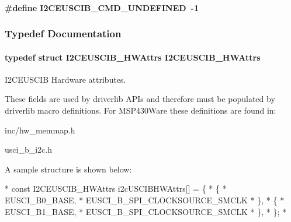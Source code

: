 \paragraph[{I2\-C\-E\-U\-S\-C\-I\-B\-\_\-\-C\-M\-D\-\_\-\-U\-N\-D\-E\-F\-I\-N\-E\-D}]{\setlength{\rightskip}{0pt plus 5cm}\#define I2\-C\-E\-U\-S\-C\-I\-B\-\_\-\-C\-M\-D\-\_\-\-U\-N\-D\-E\-F\-I\-N\-E\-D~-\/1}\label{_i2_c_e_u_s_c_i_b_8h_a8c78b9f1f07217026467a46de151f1ba}


\subsubsection{Typedef Documentation}
\paragraph[{I2\-C\-E\-U\-S\-C\-I\-B\-\_\-\-H\-W\-Attrs}]{\setlength{\rightskip}{0pt plus 5cm}typedef struct {\bf I2\-C\-E\-U\-S\-C\-I\-B\-\_\-\-H\-W\-Attrs}  {\bf I2\-C\-E\-U\-S\-C\-I\-B\-\_\-\-H\-W\-Attrs}}\label{_i2_c_e_u_s_c_i_b_8h_ac186518a479ed39f3b2938dc44a72be5}


I2\-C\-E\-U\-S\-C\-I\-B Hardware attributes. 

These fields are used by driverlib A\-P\-Is and therefore must be populated by driverlib macro definitions. For M\-S\-P430\-Ware these definitions are found in\-:
\begin{DoxyItemize}
\item inc/hw\-\_\-memmap.\-h
\item usci\-\_\-b\-\_\-i2c.\-h
\end{DoxyItemize}

A sample structure is shown below\-: 
\begin{DoxyCode}
*  \textcolor{keyword}{const} I2CEUSCIB_HWAttrs i2cUSCIBHWAttrs[] = \{
*      \{
*          EUSCI\_B0\_BASE,
*          EUSCI\_B\_SPI\_CLOCKSOURCE\_SMCLK
*      \},
*      \{
*          EUSCI\_B1\_BASE,
*          EUSCI\_B\_SPI\_CLOCKSOURCE\_SMCLK
*      \},
*  \};
*  
\end{DoxyCode}
